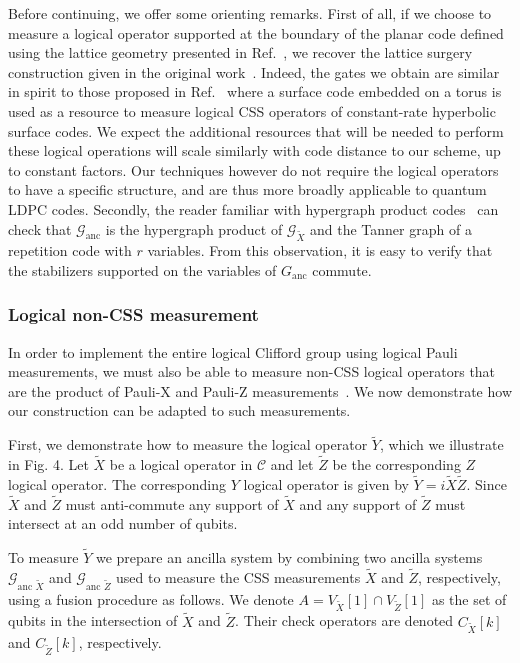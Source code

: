 \documentclass[reprint,
superscriptaddress,
 amsmath,amssymb,
 aps, longbibliography
]{revtex4-1}
\newcommand{\rev}[1]{{#1}}
\begin{document}
Before continuing, we offer some orienting remarks. First of all, if we choose to measure a logical operator supported at the boundary of the planar code defined using the lattice geometry presented in Ref.~\cite{Dennis02}, we recover the lattice surgery construction given in the original work~\cite{Horsman12}. 
\rev{Indeed, the gates we obtain are similar in spirit to those proposed in Ref.~\cite{Breuckmann17} where a surface code embedded on a torus is used as a resource to measure logical CSS operators of constant-rate hyperbolic surface codes. We expect the additional resources that will be needed to perform these logical operations will scale similarly with code distance to our scheme, up to constant factors. Our techniques however do not require the logical operators to have a specific structure, and are thus more broadly applicable to quantum LDPC codes.}
Secondly, the reader familiar with hypergraph product codes~\cite{Tillich14} can check that $\mathcal{G}_{\textrm{anc}}$ is the hypergraph product of $\mathcal{G}_{\tilde{X}}$ and the Tanner graph of a repetition code with $r$ variables. From this observation, it is easy to verify that the stabilizers supported on the variables of $G_\textrm{anc}$ commute.

\subsubsection{\label{sec:singley}Logical non-CSS measurement}

In order to implement the entire logical Clifford group using logical Pauli measurements, we must also be able to measure non-CSS logical operators that are the product of Pauli-X and Pauli-Z measurements~\cite{Brown17,Litinski19,chamberland2021universal}.  We now demonstrate how our construction can be adapted to such measurements.

First, we demonstrate how to measure the logical operator $\tilde{Y}$, which we illustrate in Fig. 4. Let $\tilde{X}$ be a logical operator in $\mathcal{C}$ and let $\tilde{Z}$ be the corresponding $Z$ logical operator. The corresponding $Y$ logical operator is given by $\tilde{Y} = i\tilde{X}\tilde{Z}$. Since $\tilde{X}$ and $\tilde{Z}$ must anti-commute any support of $\tilde{X}$ and any support of $\tilde{Z}$ must intersect at an odd number of qubits.

To measure $\tilde{Y}$ we prepare an ancilla system by combining two ancilla systems $\mathcal{G}_{\textrm{anc }\tilde{X}}$ and $\mathcal{G}_{\textrm{anc }\tilde{Z}}$ used to measure the CSS measurements $\tilde{X}$ and $\tilde{Z}$, respectively, using a fusion procedure as follows. We denote $A = V_{\tilde{X}}[1] \cap V_{\tilde{Z}}[1]$ as the set of qubits in the intersection of $\tilde{X}$ and $\tilde{Z}$. Their check operators are denoted $C_{\tilde{X}}[k] $ and $ C_{\tilde{Z}}[k]$, respectively.
 
\end{document}
